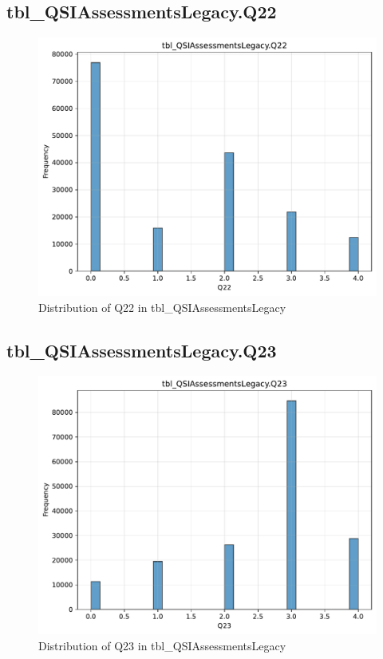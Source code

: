 \subsection{tbl\_QSIAssessmentsLegacy.Q22}

\begin{figure}[htbp]
\centering
\includegraphics[width=\textwidth]{figures/dbo_tbl_QSIAssessmentsLegacy_Q22.pdf}
\caption{Distribution of Q22 in tbl\_QSIAssessmentsLegacy}
\end{figure}\newpage

\subsection{tbl\_QSIAssessmentsLegacy.Q23}

\begin{figure}[htbp]
\centering
\includegraphics[width=\textwidth]{figures/dbo_tbl_QSIAssessmentsLegacy_Q23.pdf}
\caption{Distribution of Q23 in tbl\_QSIAssessmentsLegacy}
\end{figure}\newpage

